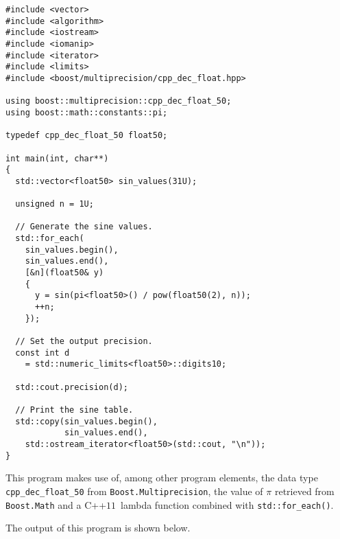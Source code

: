 \documentclass{article}[10pt]
\def\cppox        {C++$11$}
\begin{document}
\begin{lstlisting}
#include <vector>
#include <algorithm>
#include <iostream>
#include <iomanip>
#include <iterator>
#include <limits>
#include <boost/multiprecision/cpp_dec_float.hpp>

using boost::multiprecision::cpp_dec_float_50;
using boost::math::constants::pi;

typedef cpp_dec_float_50 float50;

int main(int, char**)
{
  std::vector<float50> sin_values(31U);

  unsigned n = 1U;

  // Generate the sine values.
  std::for_each(
    sin_values.begin(),
    sin_values.end(),
    [&n](float50& y)
    {
      y = sin(pi<float50>() / pow(float50(2), n));
      ++n;
    });

  // Set the output precision.
  const int d
    = std::numeric_limits<float50>::digits10;

  std::cout.precision(d);

  // Print the sine table.
  std::copy(sin_values.begin(),
            sin_values.end(),
    std::ostream_iterator<float50>(std::cout, "\n"));
}
\end{lstlisting}

This program makes use of, among other program elements,
the data type \lstinline|cpp_dec_float_50| from
\lstinline|Boost.Multiprecision|, the value of $\pi$
retrieved from \lstinline|Boost.Math|
and a \cppox\ lambda function combined with
\lstinline|std::for_each()|.

\pagebreak

The output of this program is shown below.
\end{document}
